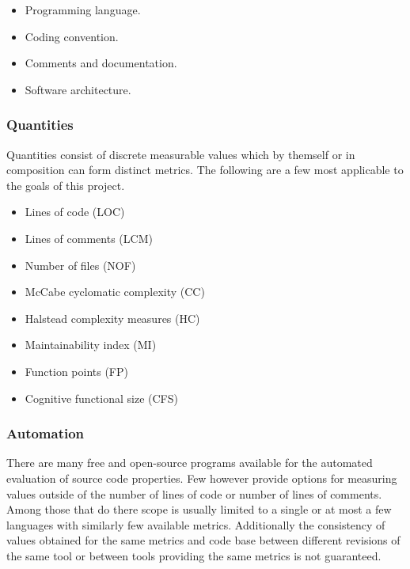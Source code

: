 \begin{itemize}
    \item Programming language.
    \item Coding convention.
    \item Comments and documentation.
    \item Software architecture.
\end{itemize}

\subsubsection{Quantities}

Quantities consist of discrete measurable values which by themself or in composition can form distinct metrics. The following are a few most applicable to the goals of this project.

\begin{itemize}
    \item Lines of code (LOC) \cite{loc}
    \item Lines of comments (LCM) \cite{lcm-1,lcm-2}
    \item Number of files (NOF) \cite{nof}
    \item McCabe cyclomatic complexity (CC) \cite{mccabe-complexity}
    \item Halstead complexity measures (HC) \cite{halstead-complexity}
    \item Maintainability index (MI) \cite{maintainability-1,maintainability-2}
    \item Function points (FP) \cite{functional-size}
    \item Cognitive functional size (CFS) \cite{cognitive-complexity}
\end{itemize}

\subsubsection{Automation}

There are many free and open-source programs available for the automated evaluation of source code properties. Few however provide options for measuring values outside of the number of lines of code or number of lines of comments. Among those that do there scope is usually limited to a single or at most a few languages with similarly few available metrics. Additionally the consistency of values obtained for the same metrics and code base between different revisions of the same tool or between tools providing the same metrics is not guaranteed.


